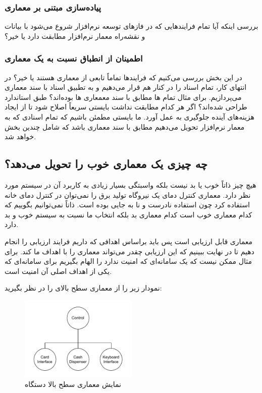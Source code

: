 \documentclass[a4paper]{article}
\begin{document}
\subsubsection{پیاده‌سازی مبتنی بر معماری}

بررسی اینکه آیا تمام فرایند‌هایی که در فاز‌های توسعه نرم‌افزار شروع می‌شود با
بیانات و نقشه‌راه معمار نرم‌افزار مطابقت دارد یا خیر؟

\subsubsection{اطمینان از انطباق نسبت به یک معماری}

در این بخش بررسی می‌کنیم که فرایند‌ها تماماً تابعی از معماری هستند یا خیر؟ در
انتهای کار، تمام‌ اسناد را در کنار هم قرار می‌دهیم و به تطبیق اسناد با سند
معماری می‌پردازیم. برای مثال تمام ها مطابق با سند معمعاری
ها بوده‌اند؟ طبق استاندارد طراحی شده‌اند؟ اگر هر کدام مطابقت نداشت
بایستی سریعاً اصلاح شود تا از ایجاد هزینه‌های آینده جلوگیری به عمل آورد. ما
بایستی مطمئن باشیم که تمام اسنادی که به معمار نرم‌افزار تحویل می‌دهیم مطابق با
سند معماری باشد که شامل چندین بخش خواهد شد.

\subsection{چه چیزی یک معماری خوب را تحویل می‌دهد؟}

هیچ چیز ذاتاً خوب یا بد نیست بلکه واسبتگی بسیار زیادی به کاربرد آن در سیستم مورد
نظر دارد. معماری کنترل دمای یک نیروگاه تولید برق را نمی‌توان در کنترل دمای خانه
استفاده کرد چون استفاده نادرست و نا به جایی بوده است. ذاتاً نمی‌توانیم بگوییم که
کدام معماری خوب است کدام معماری بد بلکه انتخاب ما نسبت به سیستم خوب و بد دارد.

معماری قابل ارزیابی است پس باید براساس اهدافی که داریم فرایند ارزیابی را انجام
دهیم تا در نهایت ببینیم که این ارزیابی چقدر می‌تواند معماری را با اهداف ما
 کند. برای مثال ممکن نیست که یک سامانه‌ای که امنیت ندارد را الهام
بگیریم برای سامانه‌ای که یکی از اهداف اصلی آن امنیت است.

نمودار زیر را از معماری سطح بالای  را در نظر بگیرید:

\begin{figure}[H]
    \centering
    \includegraphics[width=0.5\textwidth]{images/bad-arch-of-atm.drawio.pdf}
    \caption{نمایش معماری سطح بالا دستگاه }
    \label{fig:atmDiagram}
\end{figure}
\end{document}
